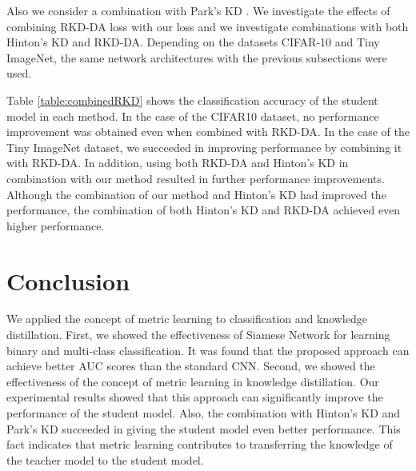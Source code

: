 \documentclass[twocolumn,10pt]{article}
\begin{document}
Also we consider a combination with Park's KD \cite{Park2019}.
We investigate the effects of combining RKD-DA loss with our loss and we investigate combinations with both Hinton's KD \cite{Hinton2015} and RKD-DA.
Depending on the datasets CIFAR-10 and Tiny ImageNet, the same network architectures with the previous subsections were used.

\begin{table}[ht]
\caption{Classification accuracy of ours KD for combined with RKD-DA}
\label{table:combinedRKD}
\begin{center}
\end{center}
\end{table}

Table \ref{table:combinedRKD} shows the classification accuracy of the student model in each method.
In the case of the CIFAR10 dataset, no performance improvement was obtained even when combined with RKD-DA.
In the case of the Tiny ImageNet dataset, we succeeded in improving performance by combining it with RKD-DA.
In addition, using both RKD-DA and Hinton's KD in combination with our method resulted in further performance improvements.
Although the combination of our method and Hinton's KD had improved the performance, the combination of both Hinton's KD and RKD-DA achieved even higher performance.
\section{Conclusion}
We applied the concept of metric learning to classification and knowledge distillation.
First, we showed the effectiveness of Siamese Network for learning binary and multi-class classification.
It was found that the proposed approach can achieve better AUC scores than the standard CNN.
Second, we showed the effectiveness of the concept of metric learning in knowledge distillation.
Our experimental results showed that this approach can significantly improve the performance of the student model.
Also, the combination with Hinton's KD \cite{Hinton2015} and Park's KD \cite{Park2019} succeeded in giving the student model even better performance.
This fact indicates that metric learning contributes to transferring the knowledge of the teacher model to the student model.
\end{document}
